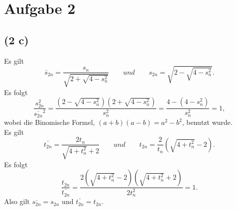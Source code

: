 \documentclass[a4paper]{article}
\begin{document}
\section*{Aufgabe 2}
\subsection*{(2 c)}
Es gilt
\begin{equation}
\bar{s}_{2n}=\frac{s_n}{\sqrt{2+\sqrt{4-s_n^2}}}\qquad und\qquad
s_{2n}=\sqrt{2-\sqrt{4-s_n^2}}.
\end{equation}
Es folgt
\begin{equation}
\frac{s_{2n}^2}{\bar{s_{2n}}^2}=\frac{(2-\sqrt{4-s_n^2})(2+\sqrt{4-s_n^2})}{s_n^2}=\frac{4-(4-s_n^2)}{s_n^2}=1,
\end{equation}
wobei die Binomische Formel, $(a+b)(a-b)=a^2-b^2$, benutzt wurde.\\
Es gilt
\begin{equation}
\bar{t_{2n}}=\frac{2t_n}{\sqrt{4+t_n^2}+2}\qquad und \qquad 
t_{2n}=\frac{2}{t_n}\left(\sqrt{4+t_n^2}-2\right).
\end{equation}
Es folgt
\begin{equation}
\frac{t_{2n}}{\bar{t_{2n}}}=\frac{2(\sqrt{4+t_n^2}-2)(\sqrt{4+t_n^2}+2)}{2t_n^2}=1.
\end{equation}
Also gilt $\bar{s_{2n}}=s_{2n}$ und $\bar{t_{2n}}=t_{2n}$.




\end{document}
